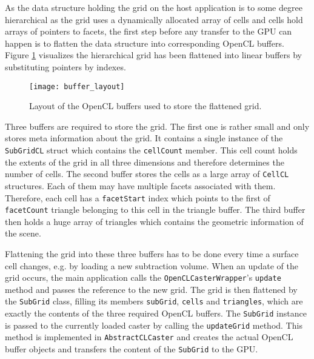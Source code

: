 As the data structure holding the grid on the host application is to some degree hierarchical as the grid uses a dynamically allocated array of cells and cells hold arrays of pointers to facets, the first step before any transfer to the GPU can happen is to flatten the data structure into corresponding OpenCL buffers. Figure \ref{fig:buffer_layout} visualizes the hierarchical grid has been flattened into linear buffers by substituting pointers by indexes.

\begin{figure}[h]
\centering
\texttt{[image: buffer\_layout]}
\caption{Layout of the OpenCL buffers used to store the flattened grid.}
\label{fig:buffer_layout}
\end{figure}

Three buffers are required to store the grid. The first one is rather small and only stores meta information about the grid. It contains a single instance of the \lstinline!SubGridCL! struct which contains the \lstinline!cellCount! member. This cell count holds the extents of the grid in all three dimensions and therefore determines the number of cells.
The second buffer stores the cells as a large array of \lstinline!CellCL! structures. Each of them may have multiple facets associated with them. Therefore, each cell has a \lstinline!facetStart! index which points to the first of \lstinline!facetCount! triangle belonging to this cell in the triangle buffer.
The third buffer then holds a huge array of triangles which contains the geometric information of the scene.

Flattening the grid into these three buffers has to be done every time a surface cell changes, e.g. by loading a new subtraction volume. When an update of the grid occurs, the main application calls the \lstinline!OpenCLCasterWrapper!'s \lstinline!update! method and passes the reference to the new grid. The grid is then flattened by the \lstinline!SubGrid! class, filling its members \lstinline!subGrid!, \lstinline!cells! and \lstinline!triangles!, which are exactly the contents of the three required OpenCL buffers. The \lstinline!SubGrid! instance is passed to the currently loaded caster by calling the \lstinline!updateGrid! method. This method is implemented in \lstinline!AbstractCLCaster! and creates the actual OpenCL buffer objects and transfers the content of the \lstinline!SubGrid! to the GPU.

